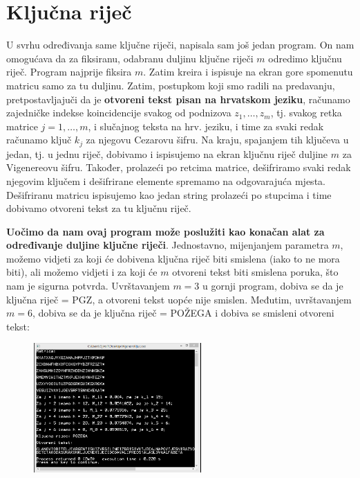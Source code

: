 \documentclass[a4paper,12pt,oneside]{article}
\begin{document}
\section*{Ključna riječ}
U svrhu određivanja same ključne riječi, napisala sam još jedan program. On nam omogućava da za fiksiranu, odabranu duljinu ključne riječi $m$ odredimo ključnu riječ. Program najprije fiksira $m$. Zatim kreira i ispisuje na ekran gore spomenutu matricu samo za tu duljinu. Zatim, postupkom koji smo radili na predavanju, pretpostavljajuči da je \textbf{otvoreni tekst pisan na hrvatskom jeziku}, računamo zajedničke indekse koincidencije svakog od podnizova $z_1, \dots, z_m$, tj. svakog retka matrice $j = 1, \dots, m$, i slučajnog teksta na hrv. jeziku, i time za svaki redak računamo ključ $k_j$ za njegovu Cezarovu šifru. Na kraju, spajanjem tih ključeva u jedan, tj. u jednu riječ, dobivamo i ispisujemo na ekran ključnu riječ duljine $m$ za Vigenereovu šifru. Također, prolazeći po retcima matrice, dešifriramo svaki redak njegovim ključem i dešifrirane elemente spremamo na odgovarajuća mjesta. Dešifriranu matricu ispisujemo kao jedan string prolazeći po stupcima i time dobivamo otvoreni tekst za tu ključnu riječ.



\textbf{Uočimo da nam ovaj program može poslužiti kao konačan alat za određivanje duljine ključne riječi}. Jednostavno, mijenjanjem parametra $m$, možemo vidjeti za koji će dobivena ključna riječ biti smislena (iako to ne mora biti), ali možemo vidjeti i za koji će $m$ otvoreni tekst biti smislena poruka, što nam je sigurna potvrda.
Uvrštavanjem $m = 3$ u gornji program, dobiva se da je ključna riječ = PGZ, a otvoreni tekst uopće nije smislen. Međutim, uvrštavanjem $m = 6$, dobiva se da je ključna riječ = POŽEGA i dobiva se smisleni otvoreni tekst:
 
\begin{figure}[h!] %
	\centering
	\includegraphics[width=0.57\textwidth]{OUTPUT3.png}  
\end{figure}
\end{document}
